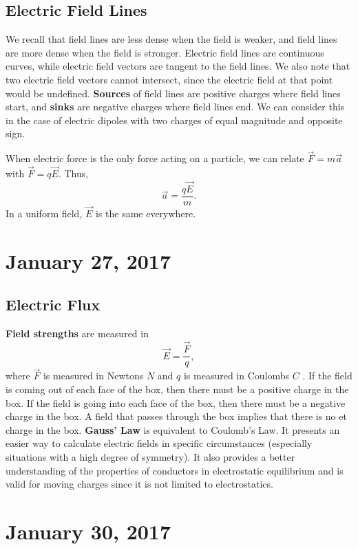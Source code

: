 \documentclass[11pt]{article}
\theoremstyle{plain} %
\theoremstyle{definition}
\theoremstyle{example}
\theoremstyle{remark}
\begin{document}
\subsection{Electric Field Lines}

We recall that field lines are less dense when the field is weaker, and field lines are more dense when the field is stronger. Electric field lines are continuous curves, while electric field vectors are tangent to the field lines. We also note that two electric field vectors cannot intersect, since the electric field at that point would be undefined. \textbf{Sources} of field lines are positive charges where field lines start, and \textbf{sinks} are negative charges where field lines end. We can consider this in the case of electric dipoles with two charges of equal magnitude and opposite sign.

When electric force is the only force acting on a particle, we can relate $\vec{F}=m\vec{a}$ with $\vec{F} = q\vec{E}$. Thus, 
$$\vec{a} = \frac{q\vec{E}}{m}.$$
In a uniform field, $\vec{E}$ is the same everywhere.





\section{January 27, 2017}
\subsection{Electric Flux}
\textbf{Field strengths} are measured in 
$$\vec{E} = \frac{\vec{F}}{q},$$
where $\vec{F}$ is measured in Newtons $N$ and $q$ is measured in Coulombs $C$ . If the field is coming out of each face of the box, then there must be a positive charge in the box. If the field is going into each face of the box, then there must be a negative charge in the box. A field that passes through the box implies that there is no et charge in the box. \textbf{Gauss' Law} is equivalent to Coulomb's Law. It presents an easier way to calculate electric fields in specific circumstances (especially situations with a high degree of symmetry). It also provides a better understanding of the properties of conductors in electrostatic equilibrium and is valid for moving charges since it is not limited to electrostatics. 

\section{January 30, 2017}
\end{document}
